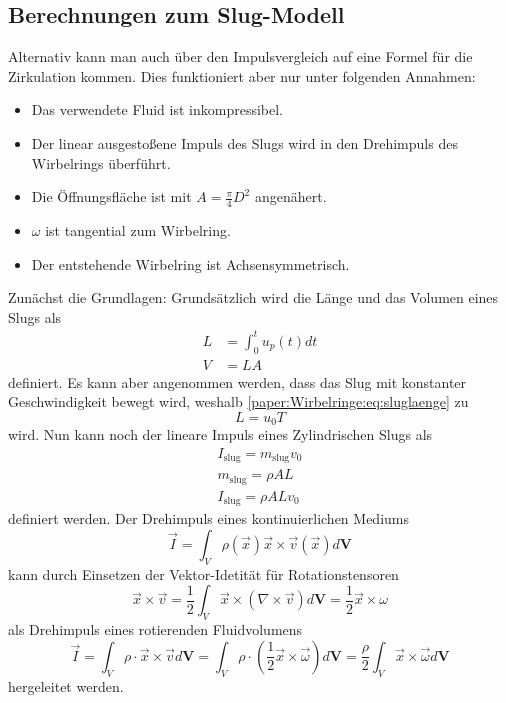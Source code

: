 \subsection{Berechnungen zum Slug-Modell}
Alternativ kann man auch über den Impulsvergleich auf eine Formel für die Zirkulation kommen.
Dies funktioniert aber nur unter folgenden Annahmen:
\begin{itemize}
    \item Das verwendete Fluid ist inkompressibel.
    \item Der linear ausgestoßene Impuls des Slugs wird in den Drehimpuls des Wirbelrings überführt.
    \item Die Öffnungsfläche ist mit $A = \frac{\pi}{4} D^2$ angenähert.
    \item $\omega$ ist tangential zum Wirbelring.
    \item Der entstehende Wirbelring ist Achsensymmetrisch.
\end{itemize} 

Zunächst die Grundlagen:
Grundsätzlich wird die Länge und das Volumen eines Slugs als
\begin{align}
    L
    &=
    \int_{0}^{t}u_p(t)dt\\
    \label{paper:Wirbelringe:eq:sluglaenge}
    V
    &=
    LA
\end{align}
definiert.
Es kann aber angenommen werden, dass das Slug mit konstanter Geschwindigkeit bewegt wird, weshalb \eqref{paper:Wirbelringe:eq:sluglaenge} zu
\begin{equation}
    L
    =
    u_0T
\end{equation}
wird.
Nun kann noch der lineare Impuls eines Zylindrischen Slugs als
\begin{align}
    I_{\text{slug}}
    =
    m_{\text{slug}}v_0\\
    m_{\text{slug}}
    =
    \rho AL\\
    I_{\text{slug}}
    =
    \rho ALv_0
    \label{paper:Wirbelringe:eq:slugImp}
\end{align}
definiert werden.
Der Drehimpuls eines kontinuierlichen Mediums
\begin{equation*}
    \vec{I}
    =
    \int_{V}\rho(\vec{x})\vec{x}\times\vec{v}(\vec{x})d\mathbf{V}
\end{equation*}
kann durch Einsetzen der Vektor-Idetität für Rotationstensoren \cite{Wirbelringe:batchelor1967}
\begin{equation*}
    \vec{x}\times\vec{v}
    =
    \frac{1}{2}\int_{V}\vec{x}\times(\nabla\times\vec{v})d\mathbf{V}
    =
    \frac{1}{2}\vec{x}\times\omega
\end{equation*}
als Drehimpuls eines rotierenden Fluidvolumens 
\begin{equation}
    \vec{I}
    =
    \int_{V}\rho\cdot\vec{x}\times\vec{v}d\mathbf{V}
    =
    \int_{V}\rho\cdot(\frac{1}{2}\vec{x}\times\vec{\omega})d\mathbf{V}
    =
    \frac{\rho}{2}\int_{V}\vec{x}\times\vec{\omega}d\mathbf{V}
    \label{paper:Wirbelringe:eq:Drehimpuls}
\end{equation}
hergeleitet werden. 

